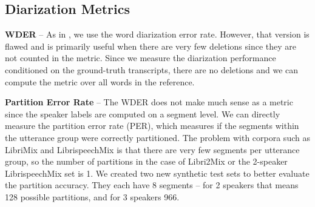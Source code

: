 \subsection{Diarization Metrics}

\textbf{WDER} -- As in \cite{shafey19_interspeech}, we use the word diarization error rate. However, that version is flawed and is primarily useful when there are very few deletions since they are not counted in the metric. Since we measure the diarization performance conditioned on the ground-truth transcripts, there are no deletions and we can compute the metric over all words in the reference.

\textbf{Partition Error Rate} -- The WDER does not make much sense as a metric since the speaker labels are computed on a segment level. We can directly measure the partition error rate (PER), which measures if the segments within the utterance group were correctly partitioned. The problem with corpora such as LibriMix and LibrispeechMix is that there are very few segments per utterance group, so the number of partitions in the case of Libri2Mix or the 2-speaker LibrispeechMix set is 1. We created two new synthetic test sets to better evaluate the partition accuracy. They each have 8 segments -- for 2 speakers that means 128 possible partitions, and for 3 speakers 966. 